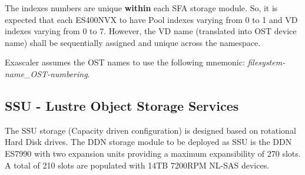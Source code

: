 \documentclass{article}
\begin{document}
\begin{table}[htbp]
\caption{ES400NVX Virtual Disks}
\label{tab:es200-vds-table}
\end{table}

The indexes numbers are unique \textbf{within} each SFA storage module. So, it is expected that each ES400NVX to have Pool indexes varying from 0 to 1 and VD indexes varying from 0 to 7. However, the VD name (translated into OST device name) shall be sequentially assigned and unique across the namespace.

Exascaler assumes the OST names to use the following mnemonic: \textit{filesystem-name}\_\textit{OST-numbering}.

\subsection{SSU - Lustre Object Storage Services}
The SSU storage (Capacity driven configuration) is designed based on rotational Hard Disk drives. The DDN storage module to be deployed as SSU is the DDN ES7990 with two expansion units providing a maximum expansibility of 270 slots. A total of 210 slots are populated with 14TB 7200RPM NL-SAS devices. 
\end{document}
